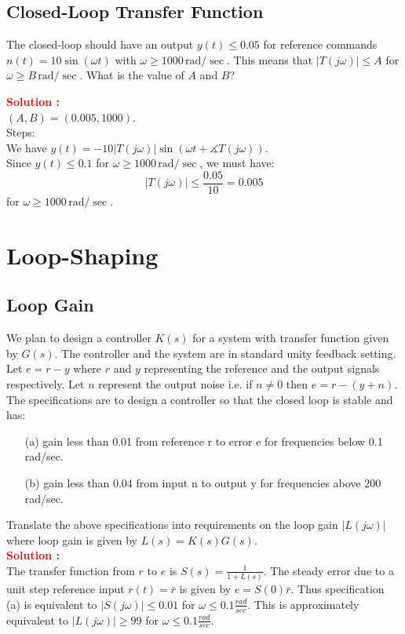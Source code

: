 \documentclass[12pt]{article}
\begin{document}
\subsection{Closed-Loop Transfer Function}

The closed-loop should have an output $y(t) \le 0.05$ for reference commands $n(t) = 10 \sin(\omega t)$  with $\omega \ge 1000 \,\text{rad}/\sec$. This means that $|T(j\omega)|\le A$ for $\omega \ge B\,\text{rad}/\sec$. What is the value of $A$ and $B$?



\textbf{\textcolor{red}{Solution :}} \\
$(A,B) = (0.005, 1000)$. \\
Steps: \\
We have $y(t) = -10 |T(j\omega)| \sin(\omega t + \measuredangle T(j\omega))$. \\
Since $y(t) \le 0.1$ for $\omega \ge 1000 \,\text{rad}/\sec$, we must have:
$$|T(j\omega)| \le \frac{0.05}{10} = 0.005$$
for $\omega \ge 1000 \,\text{rad}/\sec$. 
\clearpage

\section{Loop-Shaping}
\subsection{Loop Gain}

We plan to design a controller $K(s)$ for a system with transfer function given by $G(s)$. The controller and the system are in standard unity feedback setting. Let $e=r-y$ where $r$ and $y$ representing the reference and the output signals respectively. Let $n$ represent the output noise i.e. if $n \neq 0$ then $e=r- (y+n)$. The specifications are to design a controller so that the closed loop is stable and has:
\begin{itemize}
    \item [(a)] gain less than 0.01 from reference r to error e for frequencies below 0.1 rad/sec.
    \item [(b)] gain less than 0.04 from input n to output y for frequencies above 200 rad/sec. 
\end{itemize}
Translate the above specifications into requirements on the loop gain $|L(j \omega)|$ where loop gain is given by $L(s)=K(s) G(s)$.\\

\textbf{\textcolor{red}{Solution :}} \\
The transfer function from $r$ to $e$ is $S(s) =\frac{1}{1 + L(s)}$. The steady error due to a
unit step reference input $r(t) = \bar{r}$ is given by $e = S(0) \bar{r}$. Thus specification (a) is equivalent to $|S(j\omega)| \leq 0.01$ for $\omega \leq 0.1 \frac{rad}{sec}$. This is approximately equivalent to $|L(j\omega)| \geq 99$ for $\omega \leq 0.1 \frac{rad}{sec}$.
\end{document}
